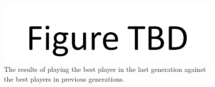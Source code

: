 \begin{figure}[htp]
\centerline{\includegraphics[width=0.75\columnwidth]{Figures/figureTBD.png}}
\caption[Validation - Comparing population sizes]{The results of playing the
best player in the last generation against the best players in previous
generations.}
\label{figure-interpopulation2}
\end{figure}
